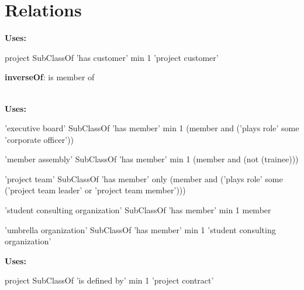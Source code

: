 \documentclass[a4paper, DIV=13, BCOR=0cm]{scrbook}
\begin{document}
\section{Relations }
\begin{mdframed}[style=onto, frametitle={has customer}]
	{%
		\textbf{Uses:}
		\begin{compactitem}
			\item project SubClassOf 'has customer' min 1 'project customer'
		\end{compactitem}
	} %
\end{mdframed}

\begin{mdframed}[style=onto, frametitle={has member}]
	{%
		\begin{compactitem}
			\item \textbf{inverseOf}: is member of
		\end{compactitem}
		\hrulefill\\
		\textbf{Uses:}
		\begin{compactitem}
			\item 'executive board' SubClassOf 'has member' min 1 (member and ('plays role' some 'corporate officer'))
			\item 'member assembly' SubClassOf 'has member' min 1 (member and (not (trainee)))
			\item 'project team' SubClassOf 'has member' only 
			(member and ('plays role' some 
			('project team leader' or 'project team member')))
			\item 'student consulting organization' SubClassOf 'has member' min 1 member
			\item 'umbrella organization' SubClassOf 'has member' min 1 'student consulting organization'
		\end{compactitem}
	} %
\end{mdframed}

\begin{mdframed}[style=onto, frametitle={is defined by}]
	{%
		\textbf{Uses:}
		\begin{compactitem}
			\item project SubClassOf 'is defined by' min 1 'project contract'
		\end{compactitem}
	} %
\end{mdframed}
\end{document}
